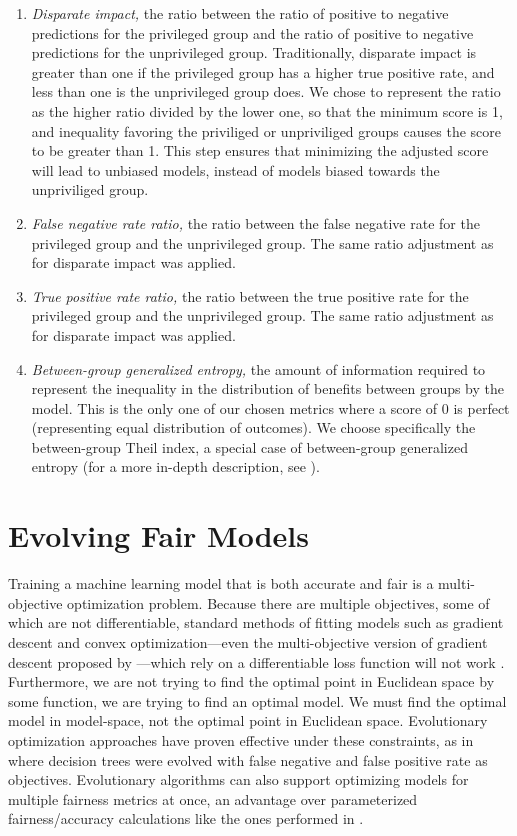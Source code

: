 \documentclass[10pt]{acmart}
\begin{document}
\begin{enumerate}
	\item \textit{Disparate impact,} the ratio between the ratio of positive to negative predictions for the privileged group and the ratio of positive to negative predictions for the unprivileged group. Traditionally, disparate impact is greater than one if the privileged group has a higher true positive rate, and less than one is the unprivileged group does. We chose to represent the ratio as the higher ratio divided by the lower one, so that the minimum score is 1, and inequality favoring the priviliged or unpriviliged groups causes the score to be greater than 1. This step ensures that minimizing the adjusted score will lead to unbiased models, instead of models biased towards the unpriviliged group.
	\item \textit{False negative rate ratio,} the ratio between the false negative rate for the privileged group and the unprivileged group. The same ratio adjustment as for disparate impact was applied.
	\item \textit{True positive rate ratio,} the ratio between the true positive rate for the privileged group and the unprivileged group. The same ratio adjustment as for disparate impact was applied.
	\item \textit{Between-group generalized entropy,} the amount of information required to represent the inequality in the distribution of benefits between groups by the model. This is the only one of our chosen metrics where a score of 0 is perfect (representing equal distribution of outcomes). We choose specifically the between-group Theil index, a special case of between-group generalized entropy (for a more in-depth description, see \cite{Speicher:2018}).
\end{enumerate}

\section{Evolving Fair Models}
Training a machine learning model that is both accurate and fair is a multi-objective optimization problem. Because there are multiple objectives, some of which are not differentiable, standard methods of fitting models such as gradient descent and convex optimization---even the multi-objective version of gradient descent proposed by \citep{Desideri:2012}---which rely on a differentiable loss function will not work \citep{Zerbinati:2011}. Furthermore, we are not trying to find the optimal point in Euclidean space by some function, we are trying to find an optimal model. We must find the optimal model in model-space, not the optimal point in Euclidean space. Evolutionary optimization approaches have proven effective under these constraints, as in \citep{Zhao:2007} where decision trees were evolved with false negative and false positive rate as objectives. Evolutionary algorithms can also support optimizing models for multiple fairness metrics at once, an advantage over parameterized fairness/accuracy calculations like the ones performed in \citep{Friedler:2019}.
\end{document}

